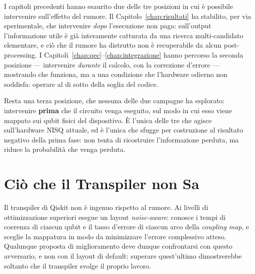 %
%
\begin{onehalfspace}

I capitoli precedenti hanno esaurito due delle tre posizioni in cui è possibile intervenire sull'effetto del rumore. Il Capitolo~\ref{chap:risultati} ha stabilito, per via sperimentale, che intervenire \emph{dopo} l'esecuzione non paga: sull'output l'informazione utile è già interamente catturata da una ricerca multi-candidato elementare, e ciò che il rumore ha distrutto non è recuperabile da alcun post-processing. I Capitoli~\ref{chap:qec}--\ref{chap:integrazione} hanno percorso la seconda posizione --- intervenire \emph{durante} il calcolo, con la correzione d'errore --- mostrando che funziona, ma a una condizione che l'hardware odierno non soddisfa: operare al di sotto della soglia del codice.

Resta una terza posizione, che nessuna delle due campagne ha esplorato: intervenire \textbf{prima} che il circuito venga eseguito, sul modo in cui esso viene mappato sui qubit fisici del dispositivo. È l'unica delle tre che agisce sull'hardware \ac{NISQ} attuale, ed è l'unica che sfugge per costruzione al risultato negativo della prima fase: non tenta di ricostruire l'informazione perduta, ma riduce la probabilità che venga perduta.

\section{Ciò che il Transpiler non Sa}
\label{sec:cosa_ignora_transpiler}

Il transpiler di Qiskit non è ingenuo rispetto al rumore. Ai livelli di ottimizzazione superiori esegue un layout \textit{noise-aware}: conosce i tempi di coerenza di ciascun qubit e il tasso d'errore di ciascun arco della \textit{coupling map}, e sceglie la mappatura in modo da minimizzare l'errore complessivo atteso. Qualunque proposta di miglioramento deve dunque confrontarsi con questo avversario, e non con il layout di default: superare quest'ultimo dimostrerebbe soltanto che il transpiler svolge il proprio lavoro.


\end{onehalfspace}
